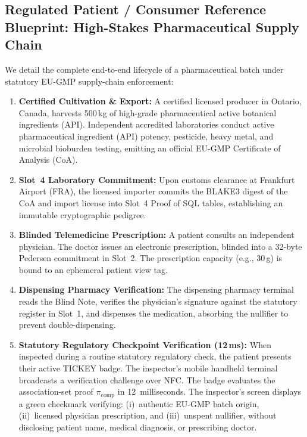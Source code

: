 \documentclass[a4paper,11pt,twoside,parskip=half-,headings=small]{scrartcl}
\begin{document}
\subsection{Regulated Patient / Consumer Reference Blueprint: High-Stakes Pharmaceutical Supply Chain}
\label{sec:gmp_walkthrough}

We detail the complete end-to-end lifecycle of a pharmaceutical batch under statutory EU-GMP supply-chain enforcement:
\begin{enumerate}
  \item \textbf{Certified Cultivation \& Export:} A certified licensed producer in Ontario, Canada, harvests 500\,kg of high-grade pharmaceutical active botanical ingredients (API). Independent accredited laboratories conduct active pharmaceutical ingredient (API) potency, pesticide, heavy metal, and microbial bioburden testing, emitting an official EU-GMP Certificate of Analysis (CoA).
  \item \textbf{Slot~4 Laboratory Commitment:} Upon customs clearance at Frankfurt Airport (FRA), the licensed importer commits the BLAKE3 digest of the CoA and import license into Slot~4 Proof of SQL tables, establishing an immutable cryptographic pedigree.
  \item \textbf{Blinded Telemedicine Prescription:} A patient consults an independent physician. The doctor issues an electronic prescription, blinded into a 32-byte Pedersen commitment in Slot~2. The prescription capacity (e.g., 30\,g) is bound to an ephemeral patient view tag.
  \item \textbf{Dispensing Pharmacy Verification:} The dispensing pharmacy terminal reads the Blind Note, verifies the physician's signature against the statutory register in Slot~1, and dispenses the medication, absorbing the nullifier to prevent double-dispensing.
  \item \textbf{Statutory Regulatory Checkpoint Verification (12\,ms):} When inspected during a routine statutory regulatory check, the patient presents their active TICKEY badge. The inspector's mobile handheld terminal broadcasts a verification challenge over NFC. The badge evaluates the association-set proof $\pi_{\text{comp}}$ in 12~milliseconds. The inspector's screen displays a green checkmark verifying: (i)~authentic EU-GMP batch origin, (ii)~licensed physician prescription, and (iii)~unspent nullifier, without disclosing patient name, medical diagnosis, or prescribing doctor.
\end{enumerate}

\end{document}
